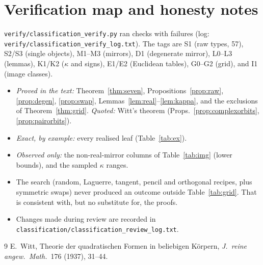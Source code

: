 \documentclass[11pt]{article}
\theoremstyle{definition}\newtheorem{definition}[theorem]{Definition}\newtheorem{remark}[theorem]{Remark}\newtheorem{example}[theorem]{Example}
\begin{document}
\section{Verification map and honesty notes}\label{sec:ver}
\texttt{verify/classification\_verify.py} ran \cntpass{} checks with \cntfail{} failures (log: \texttt{verify/classification\_verify\_log.txt}). The tags are S1 (raw types, 57), S2/S3 (single objects), M1--M3 (mirrors), D1 (degenerate mirror), L0--L3 (lemmas), K1/K2 ($\kappa$ and signs), E1/E2 (Euclidean tables), G0--G2 (grid), and I1 (image classes).
\begin{itemize}
\item \emph{Proved in the text:} Theorem~\ref{thm:seven}, Propositions~\ref{prop:raw}, \ref{prop:degen}, \ref{prop:swap}, Lemmas~\ref{lem:real}--\ref{lem:kappa}, and the exclusions of Theorem~\ref{thm:grid}. \emph{Quoted:} Witt's theorem (Props.~\ref{prop:complexorbits}, \ref{prop:pairorbits}).
\item \emph{Exact, by example:} every realised leaf (Table~\ref{tab:ex}).
\item \emph{Observed only:} the non-real-mirror columns of Table~\ref{tab:img} (lower bounds), and the sampled $\kappa$ ranges.
\item The search (random, Laguerre, tangent, pencil and orthogonal recipes, plus symmetric swaps) never produced an outcome outside Table~\ref{tab:grid}. That is consistent with, but no substitute for, the proofs.
\item Changes made during review are recorded in \texttt{classification/classification\_review\_log.txt}.
\end{itemize}

\begin{thebibliography}{9}
 E.~Witt, Theorie der quadratischen Formen in beliebigen Körpern, \emph{J.~reine angew.\ Math.}\ 176 (1937), 31--44.
\end{thebibliography}
\end{document}
